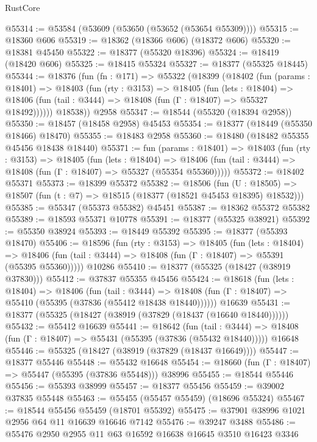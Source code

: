 \begin{lexlean}{RustCore}
\begin{coremodule}
@55314 := @53584 (@53609 (@53650 (@53652 (@53654 @55309))))
@55315 := @18360 @606
@55319 := @18362 (@18366 @606) (@18372 @606)
@55320 := @18381 @45450
@55322 := @18377 (@55320 @18396)
@55324 := @18419 (@18420 @606)
@55325 := @18415 @55324
@55327 := @18377 (@55325 @18445)
@55344 := @18376
    (fun (fn : @171) =>
    @55322
      (@18399
        (@18402
          (fun (params : @18401) =>
          @18403
            (fun (rty : @3153) =>
            @18405
              (fun (lets : @18404) =>
              @18406 (fun (tail : @3444) => @18408 (fun (Γ : @18407) => @55327 @18492))))))
        @18538))
    @2958
@55347 := @18544 (@55320 (@18394 @2958))
@55350 := @18457 (@18458 @2958) @45453
@55354 := @18377 (@18449 (@55350 @18466) @18470)
@55355 := @18483 @2958
@55360 := @18480 (@18482 @55355 @45456 @18438 @18440)
@55371 := fun (params : @18401) =>
  @18403
    (fun (rty : @3153) =>
    @18405
      (fun (lets : @18404) =>
      @18406 (fun (tail : @3444) => @18408 (fun (Γ : @18407) => @55327 (@55354 @55360)))))
@55372 := @18402 @55371
@55373 := @18399 @55372
@55382 := @18506
    (fun (U : @18505) => @18507 (fun (t : @7) => @18515 (@18377 (@18521 @45453 @18395) @18532)))
@55385 := @55347 (@55373 @55382) @45451
@55387 := @18362 @55372 @55382
@55389 := @18593 @55371 @10778
@55391 := @18377 (@55325 @38921)
@55392 := @55350 @38924
@55393 := @18449 @55392
@55395 := @18377 (@55393 @18470)
@55406 := @18596
    (fun (rty : @3153) =>
    @18405
      (fun (lets : @18404) =>
      @18406 (fun (tail : @3444) => @18408 (fun (Γ : @18407) => @55391 (@55395 @55360)))))
    @10286
@55410 := @18377 (@55325 (@18427 (@38919 @37830)))
@55412 := @37837 @55355 @45456
@55424 := @18618
    (fun (lets : @18404) =>
    @18406
      (fun (tail : @3444) =>
      @18408 (fun (Γ : @18407) => @55410 (@55395 (@37836 (@55412 @18438 @18440))))))
    @16639
@55431 := @18377 (@55325 (@18427 (@38919 (@37829 (@18437 (@16640 @18440))))))
@55432 := @55412 @16639
@55441 := @18642
    (fun (tail : @3444) => @18408 (fun (Γ : @18407) => @55431 (@55395 (@37836 (@55432 @18440)))))
    @16648
@55446 := @55325 (@18427 (@38919 (@37829 (@18437 @16649))))
@55447 := @18377 @55446
@55448 := @55432 @16648
@55454 := @18660 (fun (Γ : @18407) => @55447 (@55395 (@37836 @55448))) @38996
@55455 := @18544 @55446
@55456 := @55393 @38999
@55457 := @18377 @55456
@55459 := @39002 @37835 @55448
@55463 := @55455 (@55457 @55459) (@18696 @55324)
@55467 := @18544 @55456 @55459 (@18701 @55392)
@55475 := @37901 @38996 @1021 @2956 @64 @11 @16639 @16646 @7142
@55476 := @39247 @3488
@55486 := @55476 @2950 @2955 @11 @63 @16592 @16638 @16645 @3510 @16423 @3346

\end{coremodule}
\end{lexlean}
